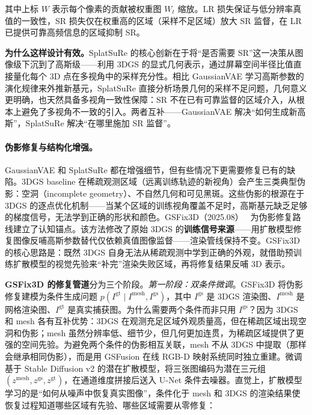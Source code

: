 其中上标 $W$ 表示每个像素的贡献被权重图 $W_t$ 缩放。LR 损失保证与低分辨率真值的一致性，SR 损失仅在权重高的区域（采样不足区域）放大 SR 监督，在 LR 已提供可靠高频信息的区域抑制 SR。

\textbf{为什么这样设计有效。}SplatSuRe 的核心创新在于将“是否需要 SR”这一决策从图像级下沉到了高斯级——利用 3DGS 的显式几何表示，通过屏幕空间半径比值直接量化每个 3D 点在多视角中的采样充分性。相比 GaussianVAE 学习高斯参数的演化规律来外推新基元，SplatSuRe 直接分析场景几何的采样不足问题，几何意义更明确，也天然具备多视角一致性保障：SR 不在已有可靠监督的区域介入，从根本上避免了多视角不一致的引入。两者互补——GaussianVAE 解决“如何生成新高斯”，SplatSuRe 解决“在哪里施加 SR 监督”。

\paragraph{伪影修复与结构化增强。}

GaussianVAE 和 SplatSuRe 都在增强细节，但有些情况下更需要修复已有的缺陷。3DGS baseline 在稀疏观测区域（远离训练轨迹的新视角）会产生三类典型伪影：空洞（incomplete geometry）、不自然几何和可见黑斑。这些伪影的根源在于 3DGS 的逐点优化机制——当某个区域的训练视角覆盖不足时，高斯基元缺乏足够的梯度信号，无法学到正确的形状和颜色。GSFix3D（2025.08）~\cite{2508_14717} 为伪影修复路线建立了认知锚点。该方法修改了原始 3DGS 的\textbf{训练信号来源}——用扩散模型修复图像反哺高斯参数替代仅依赖真值图像监督——渲染管线保持不变。GSFix3D 的核心思路是：既然 3DGS 自身无法从稀疏观测中学到正确的外观，就借助预训练扩散模型的视觉先验来“补完”渲染失败区域，再将修复结果反哺 3D 表示。

\textbf{GSFix3D 的修复管道}分为三个阶段。\textit{第一阶段：双条件微调}。GSFix3D 将伪影修复建模为条件生成问题 $p(I^{\mathrm{gt}} \mid I^{\mathrm{mesh}}, I^{\mathrm{gs}})$，其中 $I^{\mathrm{gs}}$ 是 3DGS 渲染图、$I^{\mathrm{mesh}}$ 是网格渲染图、$I^{\mathrm{gt}}$ 是真实捕获图。为什么需要两个条件而非只用 $I^{\mathrm{gs}}$？因为 3DGS 和 mesh 各有互补优势：3DGS 在观测充足区域外观质量高，但在稀疏区域出现空洞和伪影；mesh 虽然分辨率低、细节少，但几何更加连贯，为稀疏区域提供了更强的空间先验。为避免两个条件的伪影相互关联，mesh 不从 3DGS 中提取（那样会继承相同伪影），而是用 GSFusion 在线 RGB-D 映射系统同时独立重建。微调基于 Stable Diffusion v2 的潜在扩散模型，将三张图编码为潜在三元组 $(z^{\mathrm{mesh}}, z^{\mathrm{gs}}, z^{\mathrm{gt}})$，在通道维度拼接后送入 U-Net 条件去噪器。直觉上，扩散模型学习的是“如何从噪声中恢复真实图像”，条件化于 mesh 和 3DGS 的渲染结果使恢复过程知道哪些区域有先验、哪些区域需要从零修复：

